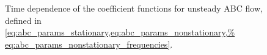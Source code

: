 \begin{figure}[htpb]
    \centering
    \caption[Time dependence of the coefficient functions for unsteady ABC flow]
    {Time dependence of the coefficient functions for unsteady ABC flow,
        defined in
        \cref{eq:abc_params_stationary,eq:abc_params_nonstationary,%
        eq:abc_params_nonstationary_frequencies}.
    }
    \label{fig:abc_timedep_coeff}
\end{figure}

